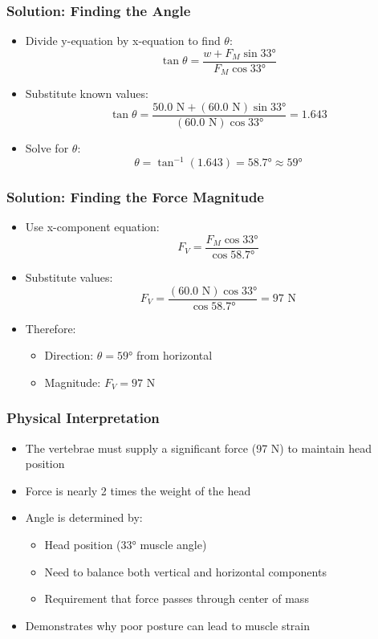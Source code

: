 \documentclass{beamer}
\begin{document}
\begin{frame}
\frametitle{Solution: Finding the Angle}
\begin{itemize}
    \item Divide y-equation by x-equation to find $\theta$:
    \[\tan \theta = \frac{w + F_M \sin 33°}{F_M \cos 33°}\]
    \item Substitute known values:
    \[\tan \theta = \frac{50.0\text{ N} + (60.0\text{ N})\sin 33°}{(60.0\text{ N})\cos 33°} = 1.643\]
    \item Solve for $\theta$:
    \[\theta = \tan^{-1}(1.643) = 58.7° \approx 59°\]
\end{itemize}
\end{frame}

\begin{frame}
\frametitle{Solution: Finding the Force Magnitude}
\begin{itemize}
    \item Use x-component equation:
    \[F_V = \frac{F_M \cos 33°}{\cos 58.7°}\]
    \item Substitute values:
    \[F_V = \frac{(60.0\text{ N})\cos 33°}{\cos 58.7°} = 97\text{ N}\]
    \item Therefore:
    \begin{itemize}
        \item Direction: $\theta = 59°$ from horizontal
        \item Magnitude: $F_V = 97$ N
    \end{itemize}
\end{itemize}
\end{frame}

\begin{frame}
\frametitle{Physical Interpretation}
\begin{itemize}
    \item The vertebrae must supply a significant force (97 N) to maintain head position
    \item Force is nearly 2 times the weight of the head
    \item Angle is determined by:
    \begin{itemize}
        \item Head position (33° muscle angle)
        \item Need to balance both vertical and horizontal components
        \item Requirement that force passes through center of mass
    \end{itemize}
    \item Demonstrates why poor posture can lead to muscle strain
\end{itemize}
\end{frame}
\end{document}
